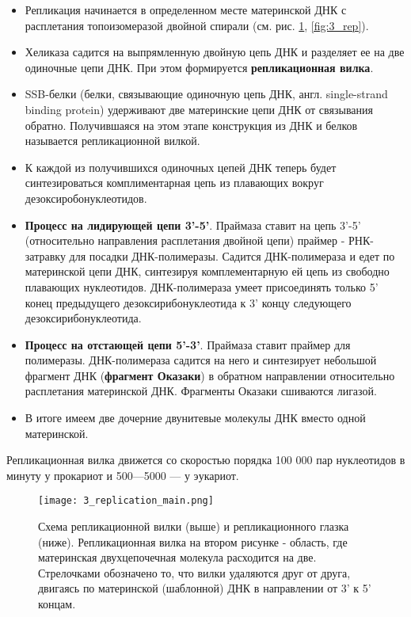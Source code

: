 \begin{itemize}
    \item Репликация начинается в определенном месте материнской ДНК с расплетания топоизомеразой двойной спирали (см. рис. \ref{fig:3_replication_main}, \ref{fig:3_rep}).
    
    \item Хеликаза садится на выпрямленную двойную цепь ДНК и разделяет ее на две одиночные цепи ДНК. При этом формируется \textbf{репликационная вилка}. 
    
    \item SSB-белки (белки, связывающие одиночную цепь ДНК, англ. single-strand binding protein) удерживают две материнские цепи ДНК от связывания обратно. Получившаяся на этом этапе конструкция из ДНК и белков называется репликационной вилкой.
    
    \item К каждой из получившихся одиночных цепей ДНК теперь будет синтезироваться комплиментарная цепь из плавающих вокруг дезоксиробонуклеотидов.
    
    \item \textbf{Процесс на лидирующей цепи  3'-5'}. Праймаза ставит на цепь 3'-5' (относительно направления расплетания двойной цепи) праймер - РНК-затравку для посадки ДНК-полимеразы. Садится ДНК-полимераза и едет по материнской цепи ДНК, синтезируя комплементарную ей цепь из свободно плавающих нуклеотидов. ДНК-полимераза умеет присоединять только 5' конец предыдущего дезоксирибонуклеотида к 3' концу следующего дезоксирибонуклеотида. 
    
    \item \textbf{Процесс на отстающей цепи 5'-3'}. Праймаза ставит праймер для полимеразы. ДНК-полимераза садится на него и синтезирует небольшой фрагмент ДНК (\textbf{фрагмент Оказаки}) в обратном направлении относительно расплетания материнской ДНК. Фрагменты Оказаки сшиваются лигазой.
    
    \item В итоге имеем две дочерние двунитевые молекулы ДНК вместо одной материнской.
    
\end{itemize}

Репликационная вилка движется со скоростью порядка 100 000 пар нуклеотидов в минуту у прокариот и 500—5000 — у эукариот.

\begin{figure}[H]
    \centering
    \texttt{[image: 3\_replication\_main.png]}
    \caption{Схема репликационной вилки (выше) и репликационного глазка (ниже). Репликационная вилка на втором рисунке - область, где материнская двухцепочечная молекула расходится на две. Стрелочками обозначено то, что вилки удаляются друг от друга, двигаясь по материнской (шаблонной) ДНК в направлении от 3' к 5' концам.}
    \label{fig:3_replication_main}
\end{figure}


